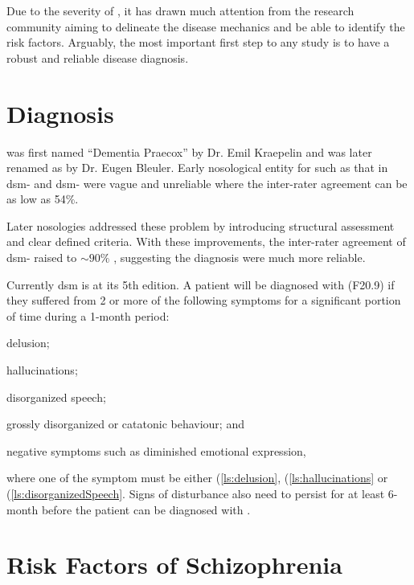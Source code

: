 \documentclass{book}
\newcommand{\rom}[1]{\uppercase\expandafter{\romannumeral #1\relax}}
\newcommand*{\glng}{\glsentrylong}
\newcommand*{\Glng}{\Glsentrylong}
\begin{document}
	Due to the severity of \glng{scz}, it has drawn much attention from the research community aiming to delineate the disease mechanics and be able to identify the risk factors.
	Arguably, the most important first step to any \glng{scz} study is to have a robust and reliable disease diagnosis.
	
	\section{Diagnosis}
	\Glng{scz} was first named ``Dementia Praecox'' by Dr. Emil Kraepelin and was later renamed as \glng{scz} by Dr. Eugen Bleuler\citep{Jablensky2010}.
	Early nosological entity for \glng{scz} such as that in \gls{dsm}-\rom{1} and \gls{dsm}-\rom{2} were vague and unreliable where the inter-rater agreement can be as low as 54$\%$.\citep{Tsuang2000,Harvey2012} 
	
	Later nosologies addressed these problem by introducing structural assessment and clear defined criteria. 
	With these improvements, the inter-rater agreement of \gls{dsm}-\rom{3} raised to $\sim 90\%$ \citep{Harvey2012}, suggesting the diagnosis were much more reliable.
	
	Currently \gls{dsm} is at its 5th edition\citep{AmericanPsychiatricAssociation2013}. 
	A patient will be diagnosed with \glng{scz}(F20.9) if they suffered from 2 or more of the following symptoms for a significant portion of time during a 1-month period: 
	\begin{enumerate*}[label=\arabic*\upshape)]
		\item delusion; \label{ls:delusion}
		\item hallucinations;\label{ls:hallucinations}
		\item disorganized speech;\label{ls:disorganizedSpeech}
		\item grossly disorganized or catatonic behaviour; and\label{ls:catatonicBehavior}
		\item negative symptoms such as diminished emotional expression,\label{ls:negativeSymptoms}
	\end{enumerate*}  where one of the symptom must be either (\ref{ls:delusion}, (\ref{ls:hallucinations} or (\ref{ls:disorganizedSpeech}.
	Signs of disturbance also need to persist for at least 6-month before the patient can be diagnosed with \glng{scz}.
	
	\section{Risk Factors of Schizophrenia}
\end{document}
